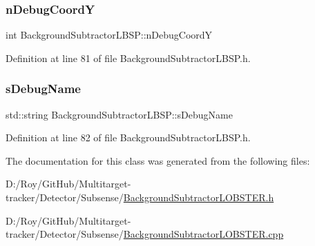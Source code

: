 \subsubsection{\texorpdfstring{n\+Debug\+CoordY}{nDebugCoordY}}
{\footnotesize\ttfamily int Background\+Subtractor\+L\+B\+S\+P\+::n\+Debug\+CoordY\hspace{0.3cm}{\ttfamily [inherited]}}



Definition at line 81 of file Background\+Subtractor\+L\+B\+S\+P.\+h.

\mbox{\label{class_background_subtractor_l_b_s_p_ada55b4a5eec8c82d0e05b0f9f1600ecb}} 
\subsubsection{\texorpdfstring{s\+Debug\+Name}{sDebugName}}
{\footnotesize\ttfamily std\+::string Background\+Subtractor\+L\+B\+S\+P\+::s\+Debug\+Name\hspace{0.3cm}{\ttfamily [inherited]}}



Definition at line 82 of file Background\+Subtractor\+L\+B\+S\+P.\+h.



The documentation for this class was generated from the following files\+:\begin{DoxyCompactItemize}
\item 
D\+:/\+Roy/\+Git\+Hub/\+Multitarget-\/tracker/\+Detector/\+Subsense/\mbox{\hyperlink{_background_subtractor_l_o_b_s_t_e_r_8h}{Background\+Subtractor\+L\+O\+B\+S\+T\+E\+R.\+h}}\item 
D\+:/\+Roy/\+Git\+Hub/\+Multitarget-\/tracker/\+Detector/\+Subsense/\mbox{\hyperlink{_background_subtractor_l_o_b_s_t_e_r_8cpp}{Background\+Subtractor\+L\+O\+B\+S\+T\+E\+R.\+cpp}}\end{DoxyCompactItemize}
